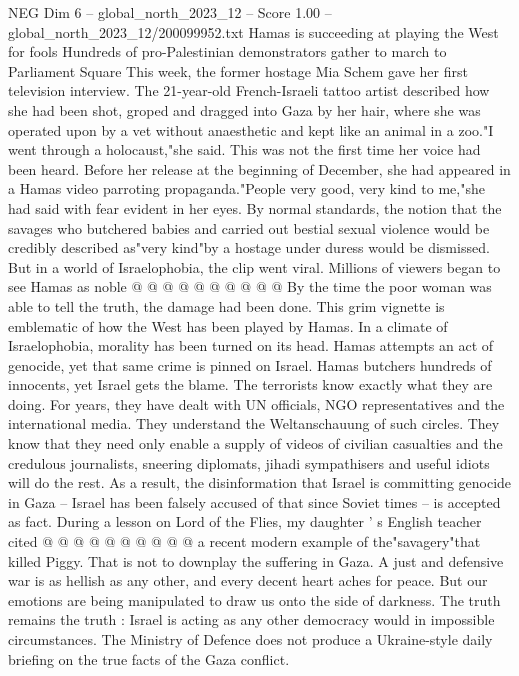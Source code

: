 \begin{textsample}{NEG Dim 6 – global\_north\_2023\_12 – Score 1.00 – global\_north\_2023\_12/200099952.txt}  \label{ex:f6_neg_259}
Hamas is succeeding at playing the West for fools Hundreds of pro-Palestinian demonstrators gather to march to Parliament Square This week, the former hostage Mia Schem gave her first television interview.
The 21-year-old French-Israeli tattoo artist described how she had been shot, groped and dragged into Gaza by her hair, where she was operated upon by a vet without anaesthetic and kept like an animal in a zoo."I went through a holocaust,"she said.
This was not the first time her voice had been heard.
Before her release at the beginning of December, she had appeared in a Hamas video parroting propaganda."People very good, very kind to me,"she had said with fear evident in her eyes.
By normal standards, the notion that the savages who butchered babies and carried out bestial sexual violence would be credibly described as"very kind"by a hostage under duress would be dismissed.
But in a world of Israelophobia, the clip went viral.
Millions of viewers began to see Hamas as noble @ @ @ @ @ @ @ @ @ @ By the time the poor woman was able to tell the truth, the damage had been done.
This grim vignette is emblematic of how the West has been played by Hamas.
In a climate of Israelophobia, morality has been turned on its head.
Hamas attempts an act of genocide, yet that same crime is pinned on Israel.
Hamas butchers hundreds of innocents, yet Israel gets the blame.
The terrorists know exactly what they are doing.
For years, they have dealt with UN officials, NGO representatives and the international media.
They understand the Weltanschauung of such circles.
They know that they need only enable a supply of videos of civilian casualties and the credulous journalists, sneering diplomats, jihadi sympathisers and useful idiots will do the rest.
As a result, the disinformation that Israel is committing genocide in Gaza -- Israel has been falsely accused of that since Soviet times -- is accepted as fact.
During a lesson on Lord of the Flies, my daughter ' s English teacher cited @ @ @ @ @ @ @ @ @ @ a recent modern example of the"savagery"that killed Piggy.
That is not to downplay the suffering in Gaza.
A just and defensive war is as hellish as any other, and every decent heart aches for peace.
But our emotions are being manipulated to draw us onto the side of darkness.
The truth remains the truth : Israel is acting as any other democracy would in impossible circumstances.
The Ministry of Defence does not produce a Ukraine-style daily briefing on the true facts of the Gaza conflict.

\end{textsample}
